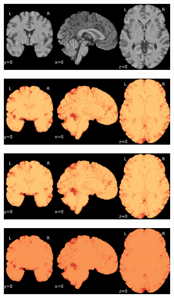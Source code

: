 \documentclass{article}
\begin{document}
\begin{appendices}
\begin{landscape}
\begin{figure}
            \begin{subfigure}[t]{0.2\paperheight}
                \centering
                \includegraphics[width=\textwidth]{figures/sig/0mm/ieee_ds002338_sub-xp207.pdf}
            \end{subfigure}
            \begin{subfigure}[t]{0.2\paperheight}
                \centering
                \includegraphics[width=\textwidth]{figures/sig/0mm/rr_ds002338_sub-xp207_sig.pdf}
            \end{subfigure}
            \begin{subfigure}[t]{0.2\paperheight}
                \centering
                \includegraphics[width=\textwidth]{figures/sig/0mm/rs_ds002338_sub-xp207_sig.pdf}
            \end{subfigure}
            \begin{subfigure}[t]{0.2\paperheight}
                \centering
                \includegraphics[width=\textwidth]{figures/sig/0mm/rr.rs_ds002338_sub-xp207_sig.pdf}

\end{subfigure}
\end{figure}
\end{landscape}
\end{appendices}
\end{document}
